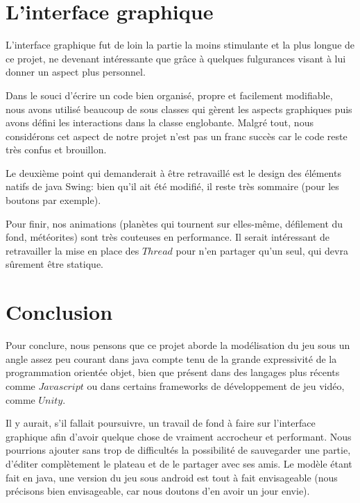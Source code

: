 \documentclass{article}
\begin{document}
\section{L'interface graphique}
L'interface graphique fut de loin la partie la moins stimulante et la plus longue de ce projet, ne devenant intéressante que grâce à quelques fulgurances visant à lui donner un aspect plus personnel.

Dans le souci d'écrire un code bien organisé, propre et facilement modifiable, nous avons utilisé beaucoup de sous classes qui gèrent les aspects graphiques puis avons défini les interactions dans la classe englobante. Malgré tout, nous considérons cet aspect de notre projet n'est pas un franc succès car le code reste très confus et brouillon.

Le deuxième point qui demanderait à être retravaillé est le design des éléments natifs de java Swing: bien qu'il ait été modifié, il reste très sommaire (pour les boutons par exemple).

Pour finir, nos animations (planètes qui tournent sur elles-même, défilement du fond, météorites) sont très couteuses en performance. Il serait intéressant de retravailler la mise en place des $Thread$ pour n'en partager qu'un seul, qui devra sûrement être statique.

\section{Conclusion}
Pour conclure, nous pensons que ce projet aborde la modélisation du jeu sous un angle assez peu courant dans java compte tenu de la grande expressivité de la programmation orientée objet, bien que présent dans des langages plus récents comme $Javascript$ ou dans certains frameworks de développement de jeu vidéo, comme $Unity$.

Il y aurait, s'il fallait poursuivre, un travail de fond à faire sur l'interface graphique afin d'avoir quelque chose de vraiment accrocheur et performant. Nous pourrions ajouter sans trop de difficultés la possibilité de sauvegarder une partie, d'éditer complètement le plateau et de le partager avec ses amis. Le modèle étant fait en java, une version du jeu sous android est tout à fait envisageable (nous précisons bien envisageable, car nous doutons d'en avoir un jour envie).

\newpage
\nocite{*}


\end{document}
